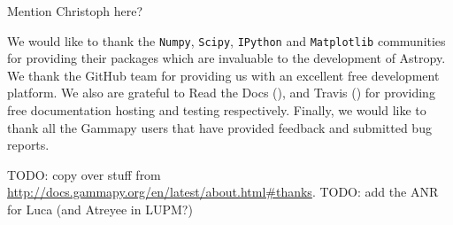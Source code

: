 \begin{acknowledgements}

	Mention Christoph here?

	We would like to thank the \texttt{Numpy}, \texttt{Scipy}, \texttt{IPython} and
	\texttt{Matplotlib} communities for providing their packages which are
	invaluable to the development of Astropy. We thank the GitHub team for
	providing us with an excellent free development platform. We also are grateful
	to Read the Docs (\ReadthedocsUrl), and Travis (\TravisUrl) for providing free
	documentation hosting and testing respectively. Finally, we would like to thank
	all the Gammapy users that have provided feedback and submitted bug reports.

	TODO: copy over stuff from
	\url{http://docs.gammapy.org/en/latest/about.html#thanks}. TODO: add the ANR
	for Luca (and Atreyee in LUPM?)

\end{acknowledgements}
